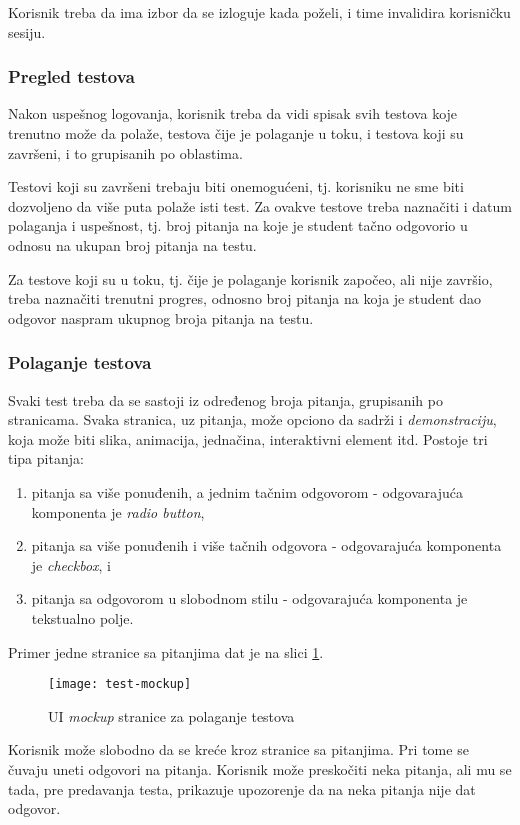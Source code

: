 Korisnik treba da ima izbor da se izloguje kada poželi, i time invalidira korisničku sesiju.

\subsubsection{Pregled testova}
Nakon uspešnog logovanja, korisnik treba da vidi spisak svih testova koje trenutno može da polaže, testova čije je polaganje u toku, i testova koji su završeni, i to grupisanih po oblastima.

Testovi koji su završeni trebaju biti onemogućeni, tj. korisniku ne sme biti dozvoljeno da više puta polaže isti test. Za ovakve testove treba naznačiti i datum polaganja i uspešnost, tj. broj pitanja na koje je student tačno odgovorio u odnosu na ukupan broj pitanja na testu.

Za testove koji su u toku, tj. čije je polaganje korisnik započeo, ali nije završio, treba naznačiti trenutni progres, odnosno broj pitanja na koja je student dao odgovor naspram ukupnog broja pitanja na testu.

\subsubsection{Polaganje testova}
Svaki test treba da se sastoji iz određenog broja pitanja, grupisanih po stranicama. Svaka stranica, uz pitanja, može opciono da sadrži i \emph{demonstraciju}, koja može biti slika, animacija, jednačina, interaktivni element itd. Postoje tri tipa pitanja:
\begin{enumerate}
\item pitanja sa više ponuđenih, a jednim tačnim odgovorom - odgovarajuća komponenta je \textit{radio button},
\item pitanja sa više ponuđenih i više tačnih odgovora - odgovarajuća komponenta je \textit{checkbox}, i
\item pitanja sa odgovorom u slobodnom stilu - odgovarajuća komponenta je tekstualno polje.
\end{enumerate}
Primer jedne stranice sa pitanjima dat je na slici \ref{fig:test-mockup}.
\begin{figure}[ht]
\centering
\texttt{[image: test-mockup]}
\caption{UI \textit{mockup} stranice za polaganje testova}
\label{fig:test-mockup}
\end{figure}

Korisnik može slobodno da se kreće kroz stranice sa pitanjima. Pri tome se čuvaju uneti odgovori na pitanja. Korisnik može preskočiti neka pitanja, ali mu se tada, pre predavanja testa, prikazuje upozorenje da na neka pitanja nije dat odgovor.

